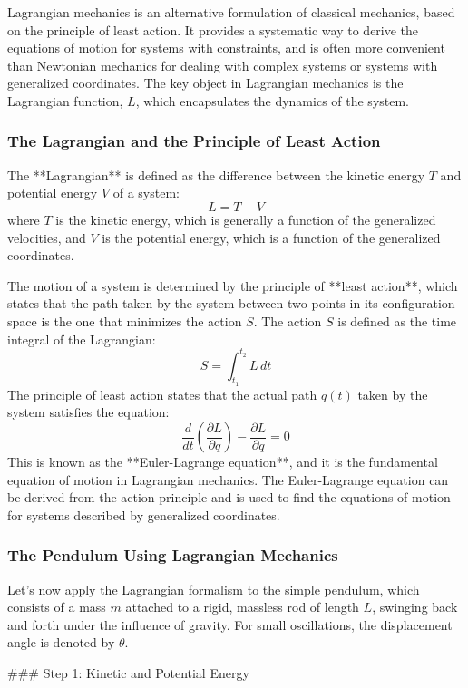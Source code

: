 \documentclass{article}
\begin{document}
Lagrangian mechanics is an alternative formulation of classical mechanics, based on the principle of least action. It provides a systematic way to derive the equations of motion for systems with constraints, and is often more convenient than Newtonian mechanics for dealing with complex systems or systems with generalized coordinates. The key object in Lagrangian mechanics is the Lagrangian function, \( L \), which encapsulates the dynamics of the system.

\subsubsection*{The Lagrangian and the Principle of Least Action}

The **Lagrangian** is defined as the difference between the kinetic energy \( T \) and potential energy \( V \) of a system:
\[
L = T - V
\]
where \( T \) is the kinetic energy, which is generally a function of the generalized velocities, and \( V \) is the potential energy, which is a function of the generalized coordinates.

The motion of a system is determined by the principle of **least action**, which states that the path taken by the system between two points in its configuration space is the one that minimizes the action \( S \). The action \( S \) is defined as the time integral of the Lagrangian:
\[
S = \int_{t_1}^{t_2} L \, dt
\]
The principle of least action states that the actual path \( q(t) \) taken by the system satisfies the equation:
\[
\frac{d}{dt} \left( \frac{\partial L}{\partial \dot{q}} \right) - \frac{\partial L}{\partial q} = 0
\]
This is known as the **Euler-Lagrange equation**, and it is the fundamental equation of motion in Lagrangian mechanics. The Euler-Lagrange equation can be derived from the action principle and is used to find the equations of motion for systems described by generalized coordinates.

\subsubsection*{The Pendulum Using Lagrangian Mechanics}

Let’s now apply the Lagrangian formalism to the simple pendulum, which consists of a mass \( m \) attached to a rigid, massless rod of length \( L \), swinging back and forth under the influence of gravity. For small oscillations, the displacement angle is denoted by \( \theta \).

### Step 1: Kinetic and Potential Energy
\end{document}
